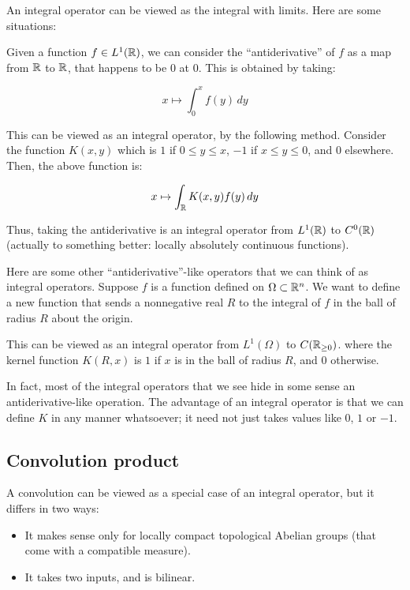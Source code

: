 \documentclass[a4paper]{amsart}
\begin{document}
An integral operator can be viewed as the integral with limits. Here
are some situations:

Given a function $f \in L^1(\mathbb{R})$, we can consider the
``antiderivative'' of $f$ as a map from $\mathbb{R}$ to $\mathbb{R}$, that happens to
be $0$ at $0$. This is obtained by taking:

$$x \mapsto \int_0^x f(y) \, dy$$

This can be viewed as an integral operator, by the following
method. Consider the function $K(x,y)$ which is $1$ if $0 \le y \le x$,
$-1$ if $x \le y \le 0$, and $0$ elsewhere. Then, the above function is:

$$x \mapsto \int_{\mathbb{R}} K(x,y) f(y) \, dy$$

Thus, taking the antiderivative is an integral operator from $L^1(\mathbb{R})$
to $C^0(\mathbb{R})$ (actually to something better: locally absolutely continuous
functions).

Here are some other ``antiderivative''-like operators that we can
think of as integral operators. Suppose $f$ is a function defined on
$\Omega \subset \mathbb{R}^n$. We want to define a new function that sends a
nonnegative real $R$ to the integral of $f$ in the ball of radius $R$
about the origin.

This can be viewed as an integral operator from $L^1(\Omega)$ to
$C(\mathbb{R}_{\ge 0})$. where the kernel function $K(R,x)$ is $1$ if $x$ is
in the ball of radius $R$, and $0$ otherwise.

In fact, most of the integral operators that we see hide in some sense
an antiderivative-like operation. The advantage of an integral
operator is that we can define $K$ in any manner whatsoever; it need
not just takes values like $0$, $1$ or $-1$.

\subsection{Convolution product}

A convolution can be viewed as a special case of an integral operator,
but it differs in two ways:

\begin{itemize}

\item It makes sense only for locally compact topological Abelian
  groups (that come with a compatible measure).

\item It takes two inputs, and is bilinear.

\end{itemize}
\end{document}

